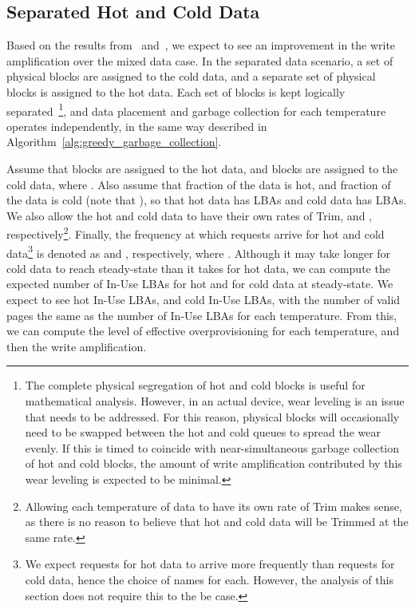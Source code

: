 \documentclass[prodmode,acmtos]{acmsmall}
\begin{document}
\subsection{Separated Hot and Cold Data}\label{sec:separated_hot_cold}
Based on the results from~ and~, we expect to see an improvement in the write amplification over the mixed data case.  In the separated data scenario, a set of physical blocks are assigned to the cold data, and a separate set of physical blocks is assigned to the hot data.  Each set of blocks is kept logically separated~\footnote{The complete physical segregation of hot and cold blocks is useful for mathematical analysis.  However, in an actual device, wear leveling is an issue that needs to be addressed.  For this reason, physical blocks will occasionally need to be swapped between the hot and cold queues to spread the wear evenly.  If this is timed to coincide with near-simultaneous garbage collection of hot and cold blocks, the amount of write amplification contributed by this wear leveling is expected to be minimal.}, and data placement and garbage collection for each temperature operates independently, in the same way described in Algorithm~\ref{alg:greedy_garbage_collection}.

Assume that  blocks are assigned to the hot data, and  blocks are assigned to the cold data, where .  Also assume that  fraction of the data is hot, and  fraction of the data is cold (note that ), so that hot data has  LBAs and cold data has  LBAs.  We also allow the hot and cold data to have their own rates of Trim,  and , respectively\footnote{Allowing each temperature of data to have its own rate of Trim makes sense, as there is no reason to believe that hot and cold data will be Trimmed at the same rate.}.  Finally, the frequency at which requests arrive for hot and cold data\footnote{We expect requests for hot data to arrive more frequently than requests for cold data, hence the choice of names for each.  However, the analysis of this section does not require this to the be case.} is denoted as  and , respectively, where .  Although it may take longer for cold data to reach steady-state than it takes for hot data, we can compute the expected number of In-Use LBAs for hot and for cold data at steady-state.  We expect to see  hot In-Use LBAs, and  cold In-Use LBAs, with the number of valid pages the same as the number of In-Use LBAs for each temperature.  From this, we can compute the level of effective overprovisioning for each temperature, and then the write amplification.
\end{document}
